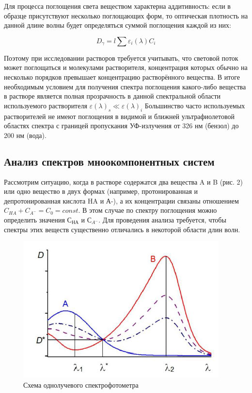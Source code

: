 \documentclass[a4paper,12pt]{article}
\begin{document}
Для процесса поглощения света веществом характерна аддитивность: если в образце присутствуют несколько поглощающих форм, то оптическая плотность на данной длине волны будет определяться суммой поглощения каждой из них:

\begin{equation}
    D_\gamma = l\sum\varepsilon_i(\lambda)C_i
    \nonumber
\end{equation}

Поэтому при исследовании растворов требуется учитывать, что световой поток может поглощаться и молекулами растворителя, концентрация которых обычно на несколько порядков превышает концентрацию растворённого вещества. В итоге необходимым условием для получения спектра поглощения какого-либо вещества в растворе является полная прозрачность в данной спектральной области используемого растворителя $\varepsilon(\lambda)_s \ll \varepsilon(\lambda)_i$
Большинство часто используемых растворителей не имеют поглощения в видимой и ближней ультрафиолетовой областях спектра с границей пропускания УФ-излучения от 326 нм (бензол) до 200 нм (вода).

\subsection*{Анализ спектров мноокомпонентных систем}

Рассмотрим ситуацию, когда в растворе содержатся два вещества A и B (рис. 2) или одно вещество в двух формах (например, протонированная и депротонированная кислота HA и А-), а их концентрации связаны отношением $C_{HA} + C_{A^{-}} = C_0 = const$. В этом случае по спектру поглощения можно определить значения $С_{НА}$ и $С_{A^{-}}$. Для проведения анализа требуется, чтобы спектры этих веществ существенно отличались в некоторой области длин волн. 

\begin{figure}[H]
    \centering
    \includegraphics[scale=0.75]{Спектры.png}
    \centering
    \caption{Схема однолучевого спектрофотометра}
\end{figure}
\end{document}
